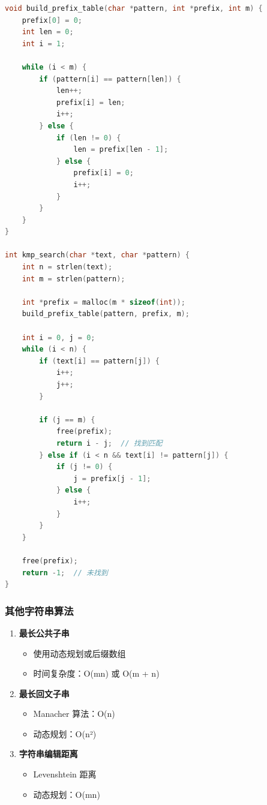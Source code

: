 \begin{lstlisting}[language=C, caption={KMP 算法实现}]
void build_prefix_table(char *pattern, int *prefix, int m) {
    prefix[0] = 0;
    int len = 0;
    int i = 1;

    while (i < m) {
        if (pattern[i] == pattern[len]) {
            len++;
            prefix[i] = len;
            i++;
        } else {
            if (len != 0) {
                len = prefix[len - 1];
            } else {
                prefix[i] = 0;
                i++;
            }
        }
    }
}

int kmp_search(char *text, char *pattern) {
    int n = strlen(text);
    int m = strlen(pattern);

    int *prefix = malloc(m * sizeof(int));
    build_prefix_table(pattern, prefix, m);

    int i = 0, j = 0;
    while (i < n) {
        if (text[i] == pattern[j]) {
            i++;
            j++;
        }

        if (j == m) {
            free(prefix);
            return i - j;  // 找到匹配
        } else if (i < n && text[i] != pattern[j]) {
            if (j != 0) {
                j = prefix[j - 1];
            } else {
                i++;
            }
        }
    }

    free(prefix);
    return -1;  // 未找到
}
\end{lstlisting}

\subsubsection{其他字符串算法}

\begin{enumerate}
  \item \textbf{最长公共子串}
    \begin{itemize}
      \item 使用动态规划或后缀数组
      \item 时间复杂度：O(mn) 或 O(m + n)
    \end{itemize}

  \item \textbf{最长回文子串}
    \begin{itemize}
      \item Manacher 算法：O(n)
      \item 动态规划：O(n²)
    \end{itemize}

  \item \textbf{字符串编辑距离}
    \begin{itemize}
      \item Levenshtein 距离
      \item 动态规划：O(mn)
    \end{itemize}
\end{enumerate}


